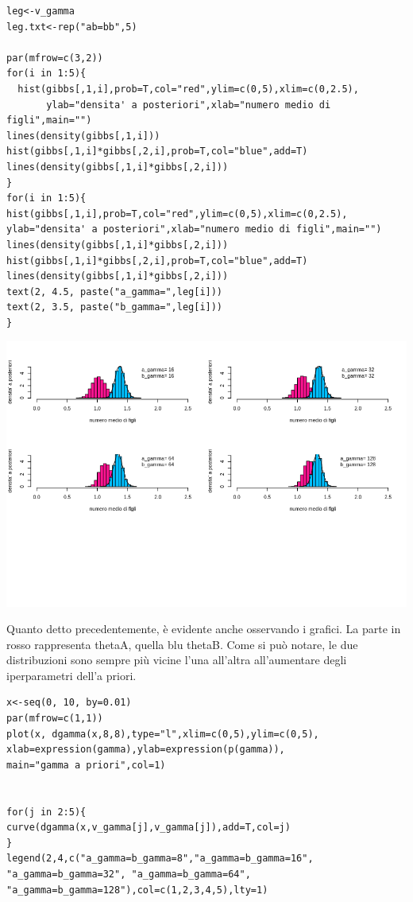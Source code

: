 \begin{enumerate}
\begin{lstlisting}[style=R]
leg<-v_gamma
leg.txt<-rep("ab=bb",5)

par(mfrow=c(3,2))
for(i in 1:5){
  hist(gibbs[,1,i],prob=T,col="red",ylim=c(0,5),xlim=c(0,2.5),
       ylab="densita' a posteriori",xlab="numero medio di figli",main="")
lines(density(gibbs[,1,i]))
hist(gibbs[,1,i]*gibbs[,2,i],prob=T,col="blue",add=T)
lines(density(gibbs[,1,i]*gibbs[,2,i]))
}
for(i in 1:5){
hist(gibbs[,1,i],prob=T,col="red",ylim=c(0,5),xlim=c(0,2.5),
ylab="densita' a posteriori",xlab="numero medio di figli",main="")
lines(density(gibbs[,1,i]*gibbs[,2,i]))
hist(gibbs[,1,i]*gibbs[,2,i],prob=T,col="blue",add=T)
lines(density(gibbs[,1,i]*gibbs[,2,i]))
text(2, 4.5, paste("a_gamma=",leg[i]))
text(2, 3.5, paste("b_gamma=",leg[i]))
}
\end{lstlisting} 

\begin{center}
\includegraphics[width=\linewidth]{img/esercizio6-1-1}
\end{center}

Quanto detto precedentemente, è evidente anche osservando i grafici.
La parte in rosso rappresenta thetaA, quella blu thetaB.
Come si può notare, le due distribuzioni sono sempre più vicine l'una all'altra all'aumentare degli iperparametri dell'a priori.

\begin{lstlisting}[style=R]
x<-seq(0, 10, by=0.01)
par(mfrow=c(1,1))
plot(x, dgamma(x,8,8),type="l",xlim=c(0,5),ylim=c(0,5),
xlab=expression(gamma),ylab=expression(p(gamma)),
main="gamma a priori",col=1)


for(j in 2:5){
curve(dgamma(x,v_gamma[j],v_gamma[j]),add=T,col=j)
}
legend(2,4,c("a_gamma=b_gamma=8","a_gamma=b_gamma=16",
"a_gamma=b_gamma=32", "a_gamma=b_gamma=64",
"a_gamma=b_gamma=128"),col=c(1,2,3,4,5),lty=1)
\end{lstlisting}


\end{enumerate}

